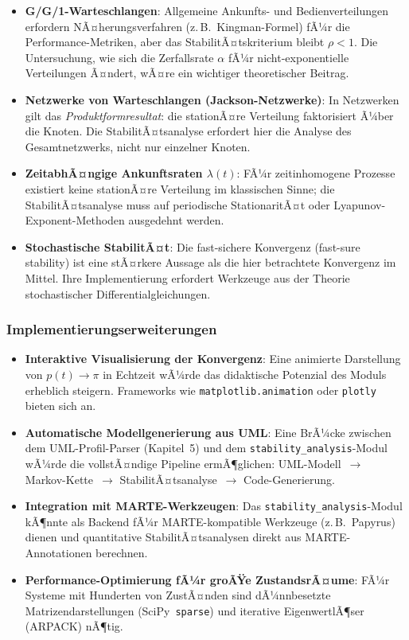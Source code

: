 ﻿\documentclass[a4paper,12pt]{scrreprt}
\theoremstyle{definition}
\begin{document}
\begin{itemize}
	\item \textbf{G/G/1-Warteschlangen}: Allgemeine Ankunfts- und
	Bedienverteilungen erfordern NÃ¤herungsverfahren (z.\,B.\ 
	Kingman-Formel) fÃ¼r die Performance-Metriken, aber das
	StabilitÃ¤tskriterium bleibt $\rho < 1$.  Die Untersuchung,
	wie sich die Zerfallsrate $\alpha$ fÃ¼r nicht-exponentielle
	Verteilungen Ã¤ndert, wÃ¤re ein wichtiger theoretischer Beitrag.
	
	\item \textbf{Netzwerke von Warteschlangen (Jackson-Netzwerke)}:
	In Netzwerken gilt das \emph{Produktformresultat}: die
	stationÃ¤re Verteilung faktorisiert Ã¼ber die Knoten.  Die
	StabilitÃ¤tsanalyse erfordert hier die Analyse des
	Gesamtnetzwerks, nicht nur einzelner Knoten.
	
	\item \textbf{ZeitabhÃ¤ngige Ankunftsraten $\lambda(t)$}: FÃ¼r
	zeitinhomogene Prozesse existiert keine stationÃ¤re
	Verteilung im klassischen Sinne; die StabilitÃ¤tsanalyse
	muss auf periodische StationaritÃ¤t oder
	Lyapunov-Exponent-Methoden ausgedehnt werden.
	
	\item \textbf{Stochastische StabilitÃ¤t}: Die fast-sichere
	Konvergenz (fast-sure stability) ist eine stÃ¤rkere Aussage
	als die hier betrachtete Konvergenz im Mittel.  Ihre
	Implementierung erfordert Werkzeuge aus der Theorie
	stochastischer Differentialgleichungen.
\end{itemize}

\subsubsection{Implementierungserweiterungen}

\begin{itemize}
	\item \textbf{Interaktive Visualisierung der Konvergenz}: Eine
	animierte Darstellung von $p(t) \to \pi$ in Echtzeit wÃ¼rde
	das didaktische Potenzial des Moduls erheblich steigern.
	Frameworks wie \texttt{matplotlib.animation} oder
	\texttt{plotly} bieten sich an.
	
	\item \textbf{Automatische Modellgenerierung aus UML}: Eine
	BrÃ¼cke zwischen dem UML-Profil-Parser (Kapitel~5) und dem
	\texttt{stability\_analysis}-Modul wÃ¼rde die vollstÃ¤ndige
	Pipeline ermÃ¶glichen: UML-Modell~$\to$ Markov-Kette~$\to$
	StabilitÃ¤tsanalyse~$\to$ Code-Generierung.
	
	\item \textbf{Integration mit MARTE-Werkzeugen}: Das
	\texttt{stability\_analysis}-Modul kÃ¶nnte als Backend fÃ¼r
	MARTE-kompatible Werkzeuge (z.\,B.\ Papyrus) dienen und
	quantitative StabilitÃ¤tsanalysen direkt aus MARTE-Annotationen
	berechnen.
	
	\item \textbf{Performance-Optimierung fÃ¼r groÃŸe ZustandsrÃ¤ume}:
	FÃ¼r Systeme mit Hunderten von ZustÃ¤nden sind dÃ¼nnbesetzte
	Matrizendarstellungen (SciPy~\texttt{sparse}) und
	iterative EigenwertlÃ¶ser (ARPACK) nÃ¶tig.
\end{itemize}
\end{document}
